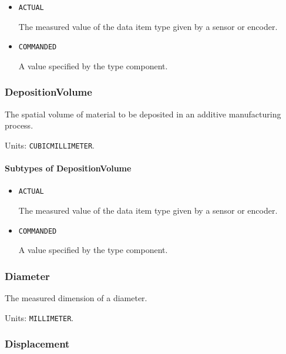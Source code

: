 \begin{itemize}

\item \texttt{ACTUAL}


The measured value of the data item type given by a sensor or encoder.

\item \texttt{COMMANDED}


A value specified by the  type component.


\end{itemize}

\subsubsection{DepositionVolume}
\label{sec:DepositionVolume}



The spatial volume of material to be deposited in an additive manufacturing process.


Units: \texttt{CUBIC\textunderscore MILLIMETER}.

\paragraph{Subtypes of DepositionVolume}\mbox{}
\label{sec:Subtypes of DepositionVolume}

\begin{itemize}

\item \texttt{ACTUAL}


The measured value of the data item type given by a sensor or encoder.

\item \texttt{COMMANDED}


A value specified by the  type component.


\end{itemize}

\subsubsection{Diameter}
\label{sec:Diameter}



The measured dimension of a diameter.


Units: \texttt{MILLIMETER}.

\subsubsection{Displacement}
\label{sec:Displacement}




